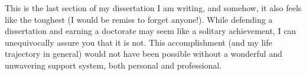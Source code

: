



This is the last section of my dissertation I am writing, and somehow, it also feels like the toughest (I would be remiss to forget anyone!). While defending a dissertation and earning a doctorate may seem like a solitary achievement, I can unequivocally assure you that it is not. This accomplishment (and my life trajectory in general) would not have been possible without a wonderful and unwavering support system, both personal and professional.


